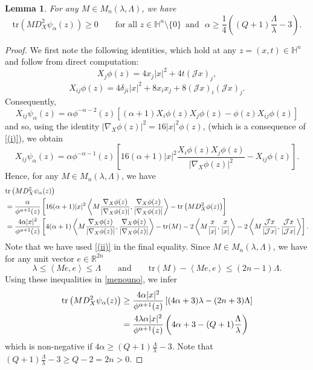 \documentclass[12pt]{amsart}
\newtheorem{Lemma}[Theorem]{Lemma}
\newcommand{\R}{{\mathbb R}}
\newcommand{\J}{\mathcal{J}}
\newcommand{\la}{\left\langle}
\newcommand{\ra}{\right\rangle}
\def \tr {\mathrm{tr}}
\def \Hn {{\mathbb H}^n}
\def \a {\alpha}
\def \la {\left\langle }
\def \ra {\right\rangle}
\def \tr {\mathrm{tr}}
\begin{document}
\begin{Lemma}\label{subsolutionlemma} 
For any $M\in M_n(\lambda,\Lambda)$, we have
\begin{equation}\label{subsolutionHgeneric}
\tr \left(M D^2_X \psi_{\a}(z)\right) \geq 0 \qquad  \text{for all } z \in \Hn\setminus\{0\} \,  \text{ and  }\,\,\a\geq \frac{1}{4}\left( (Q+1)\frac{\Lambda}{\lambda} - 3\right).
\end{equation}
\end{Lemma}
\begin{proof} 
We first note the following identities, which hold at any $z=(x,t)\in \Hn$ and follow from direct computation:
\begin{equation}\label{(i)}
X_j \phi(z) = 4x_j |x|^2 + 4t (\J x)_j,
\end{equation}
\begin{equation}\label{(ii)}
X_{ij} \phi(z) = 4\delta_{ji} |x|^2 + 8 x_i x_j + 8 (\J x)_i (\J x)_j.
\end{equation}
Consequently,
$$X_{ij} \psi_\alpha(z) =  \a \phi^{-\alpha-2}(z) \left[(\alpha + 1) X_i \phi(z)X_j \phi(z) - \phi(z)X_{ij} \phi(z) \right]$$
and so, using the identity $| \nabla_X \phi(z)|^2= 16 |x|^2 \phi(z)$, (which is a consequence of \eqref{(i)}), we obtain
$$
X_{ij} \psi_\alpha(z)=\a \phi^{-\alpha-1}(z) \left[16(\alpha + 1)|x|^2 \frac{X_i \phi(z) X_j \phi(z)}{|\nabla_X \phi(z)|^2} - X_{ij} \phi(z) \right].
$$
Hence, for any $M\in M_n(\lambda,\Lambda)$, we have
\begin{align}\label{menouno}
& \tr \left(M D^2_X \psi_{\a}(z)\right) \\
&= \frac{\a}{\phi^{\alpha+1}(z)} \left[16(\alpha + 1)|x|^2 \la M \frac{\nabla_X \phi(z)}{|\nabla_X \phi(z)|}, \frac{\nabla_X \phi(z)}{|\nabla_X \phi(z)|} \ra - \text{tr}\left(M D^2_X \phi(z) \right) \right]\notag \\
&= \frac{4 \a |x|^2}{\phi^{\alpha+1}(z)} \left[4(\alpha + 1) \la M \frac{\nabla_X \phi(z)}{|\nabla_X \phi(z)|}, \frac{\nabla_X \phi(z)}{|\nabla_X \phi(z)|} \ra - \text{tr}(M) - 2 \la M \frac{x}{|x|}, \frac{x}{|x|} \ra - 2 \la M \frac{\J x}{| \J x|}, \frac{\J x}{|\J x|} \ra \right]. \notag
\end{align}
Note that we have used \eqref{(ii)} in the final equality. Since $M \in M_n(\lambda,\Lambda)$, we have for any unit vector $e\in \R^{2n}$ 
$$
\lambda\leq \left\langle Me,e\right\rangle \leq \Lambda \qquad \text{and} \qquad \tr(M) - \left\langle Me,e\right\rangle \leq  (2n-1)\Lambda.
$$ 
Using these inequalities in \eqref{menouno}, we infer
\begin{align}\label{weightss}
\tr \left(M D^2_X \psi_{\a}(z)\right)&\geq  \frac{4 \a |x|^2}{\phi^{\alpha+1}(z)}  \left[(4\alpha + 3)\lambda - (2n+3)\Lambda\right]\notag\\
&=  \frac{4 \lambda \a |x|^2}{\phi^{\alpha+1}(z)} \left( 4\a + 3 - (Q+1)\frac{\Lambda}{\lambda} \right)
\end{align}
which is non-negative if $4\a\geq (Q+1)\frac{\Lambda}{\lambda} - 3$. Note that $(Q+1)\frac{\Lambda}{\lambda} - 3\geq Q-2=2n>0$.
\end{proof}
\end{document}

